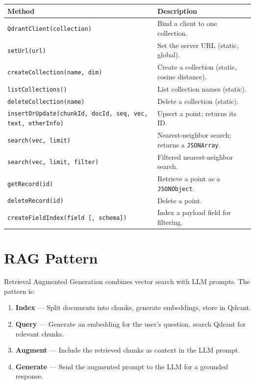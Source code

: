 \begin{longtable}{P{6.6cm}P{3.9cm}}
\toprule
\textbf{Method} & \textbf{Description} \\
\midrule
\endhead
\texttt{QdrantClient(collection)} & Bind a client to one collection. \\
\texttt{setUrl(url)} & Set the server URL (static, global). \\
\texttt{createCollection(name, dim)} & Create a collection (static, cosine distance). \\
\texttt{listCollections()} & List collection names (static). \\
\texttt{deleteCollection(name)} & Delete a collection (static). \\
\texttt{insertOrUpdate(chunkId, docId, seq, vec, text, otherInfo)} & Upsert a point; returns its ID. \\
\texttt{search(vec, limit)} & Nearest-neighbor search; returns a \texttt{JSONArray}. \\
\texttt{search(vec, limit, filter)} & Filtered nearest-neighbor search. \\
\texttt{getRecord(id)} & Retrieve a point as a \texttt{JSONObject}. \\
\texttt{deleteRecord(id)} & Delete a point. \\
\texttt{createFieldIndex(field [, schema])} & Index a payload field for filtering. \\
\bottomrule
\end{longtable}

\section{RAG Pattern}
\label{sec:llm-rag}

Retrieval Augmented Generation combines vector search with LLM prompts.  The pattern is:

\begin{enumerate}
  \item \textbf{Index} --- Split documents into chunks, generate embeddings, store in Qdrant.
  \item \textbf{Query} --- Generate an embedding for the user's question, search Qdrant for relevant chunks.
  \item \textbf{Augment} --- Include the retrieved chunks as context in the LLM prompt.
  \item \textbf{Generate} --- Send the augmented prompt to the LLM for a grounded response.
\end{enumerate}

